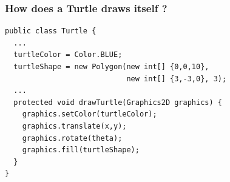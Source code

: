 \documentclass[10pt, handout]{beamer}
\begin{document}
\begin{frame}[fragile]
  \frametitle{How does a Turtle draws itself ?}
\begin{verbatim}
public class Turtle {
  ...
  turtleColor = Color.BLUE;
  turtleShape = new Polygon(new int[] {0,0,10},
                            new int[] {3,-3,0}, 3);
  ...
  protected void drawTurtle(Graphics2D graphics) {
    graphics.setColor(turtleColor);
    graphics.translate(x,y);
    graphics.rotate(theta);
    graphics.fill(turtleShape);
  }
}
\end{verbatim}
\end{frame}
\end{document}
